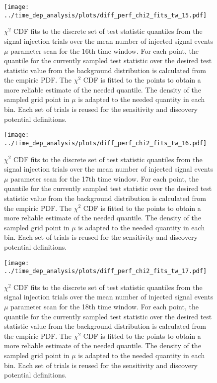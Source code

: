 \begin{figure}[H]
  \centering
  \texttt{[image: ../time\_dep\_analysis/plots/diff\_perf\_chi2\_fits\_tw\_15.pdf]}
  \caption[$\chi^2$ CDF fits for the 16th time window differential performance]{
     $\chi^2$ CDF fits to the discrete set of test statistic quantiles from the signal injection trials over the mean number of injected signal events $\mu$ parameter scan for the 16th time window.
     For each point, the quantile for the currently sampled test statistic over the desired test statistic value from the background distribution is calculated from the empiric PDF.
     The $\chi^2$ CDF is fitted to the points to obtain a more reliable estimate of the needed quantile.
     The density of the sampled grid point in $\mu$ is adapted to the needed quantity in each bin.
     Each set of trials is reused for the sensitivity and discovery potential definitions.
  }
  \label{fig:diff_perf_chi2_fits_tw_15}
\end{figure}
\begin{figure}[H]
  \centering
  \texttt{[image: ../time\_dep\_analysis/plots/diff\_perf\_chi2\_fits\_tw\_16.pdf]}
  \caption[$\chi^2$ CDF fits for the 17th time window differential performance]{
     $\chi^2$ CDF fits to the discrete set of test statistic quantiles from the signal injection trials over the mean number of injected signal events $\mu$ parameter scan for the 17th time window.
     For each point, the quantile for the currently sampled test statistic over the desired test statistic value from the background distribution is calculated from the empiric PDF.
     The $\chi^2$ CDF is fitted to the points to obtain a more reliable estimate of the needed quantile.
     The density of the sampled grid point in $\mu$ is adapted to the needed quantity in each bin.
     Each set of trials is reused for the sensitivity and discovery potential definitions.
  }
  \label{fig:diff_perf_chi2_fits_tw_16}
\end{figure}
\begin{figure}[H]
  \centering
  \texttt{[image: ../time\_dep\_analysis/plots/diff\_perf\_chi2\_fits\_tw\_17.pdf]}
  \caption[$\chi^2$ CDF fits for the 18th time window differential performance]{
     $\chi^2$ CDF fits to the discrete set of test statistic quantiles from the signal injection trials over the mean number of injected signal events $\mu$ parameter scan for the 18th time window.
     For each point, the quantile for the currently sampled test statistic over the desired test statistic value from the background distribution is calculated from the empiric PDF.
     The $\chi^2$ CDF is fitted to the points to obtain a more reliable estimate of the needed quantile.
     The density of the sampled grid point in $\mu$ is adapted to the needed quantity in each bin.
     Each set of trials is reused for the sensitivity and discovery potential definitions.
  }
  \label{fig:diff_perf_chi2_fits_tw_17}
\end{figure}
